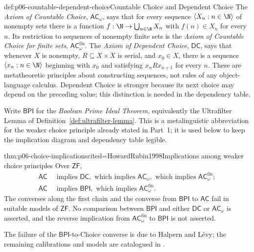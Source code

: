 \begin{hbdefinition}{def:p06-countable-dependent-choice}{Countable Choice and Dependent Choice}
The \emph{Axiom of Countable Choice}, \(\mathsf{AC}_{\omega}\), says that
for every sequence \(\langle X_n:n\in\N\rangle\) of nonempty sets there is
a function \(f:\N\to\bigcup_{n\in\N}X_n\) with \(f(n)\in X_n\) for every
\(n\).  Its restriction to sequences of nonempty finite sets is the
\emph{Axiom of Countable Choice for finite sets},
\(\mathsf{AC}_{\omega}^{\mathrm{fin}}\).  The \emph{Axiom of Dependent
Choice}, \(\mathsf{DC}\), says that whenever \(X\) is nonempty,
\(R\subseteq X\times X\) is serial, and \(x_0\in X\), there is a sequence
\(\langle x_n:n\in\N\rangle\) beginning with \(x_0\) and satisfying
\(x_nRx_{n+1}\) for every \(n\).
These are metatheoretic principles about constructing sequences, not rules of
any object-language calculus.  Dependent Choice is stronger because its next
choice may depend on the preceding value; this distinction is needed in the
dependency table.
\end{hbdefinition}

Write \(\mathsf{BPI}\) for the \emph{Boolean Prime Ideal Theorem}, equivalently
the Ultrafilter Lemma of Definition~\ref{def:ultrafilter-lemma}.  This is a
metalinguistic abbreviation for the weaker choice principle already stated in
Part~1; it is used below to keep the implication diagram and dependency table
legible.

\begin{hbtheorem}{thm:p06-choice-implications}{cited=HowardRubin1998}{Implications among weaker choice principles}
Over \(\mathsf{ZF}\),
\[
  \begin{aligned}
    \mathsf{AC}&\ \text{ implies }\mathsf{DC},\text{ which implies }
      \mathsf{AC}_{\omega},\text{ which implies }
      \mathsf{AC}_{\omega}^{\mathrm{fin}};\\
    \mathsf{AC}&\ \text{ implies }\mathsf{BPI},\text{ which implies }
      \mathsf{AC}_{\omega}^{\mathrm{fin}}.
  \end{aligned}
\]
The converses along the first chain and the converse from \(\mathsf{BPI}\) to
\(\mathsf{AC}\) fail in suitable models of \(\mathsf{ZF}\).  No comparison
between \(\mathsf{BPI}\) and either \(\mathsf{DC}\) or
\(\mathsf{AC}_{\omega}\) is asserted, and the reverse implication from
\(\mathsf{AC}_{\omega}^{\mathrm{fin}}\) to \(\mathsf{BPI}\) is not asserted.
\end{hbtheorem}
The failure of the \(\mathsf{BPI}\)-to-Choice converse is due to Halpern and
L\'evy; the remaining calibrations and models are catalogued in
\cite{Jech1973Choice,HowardRubin1998,HalpernLevy1971}.

